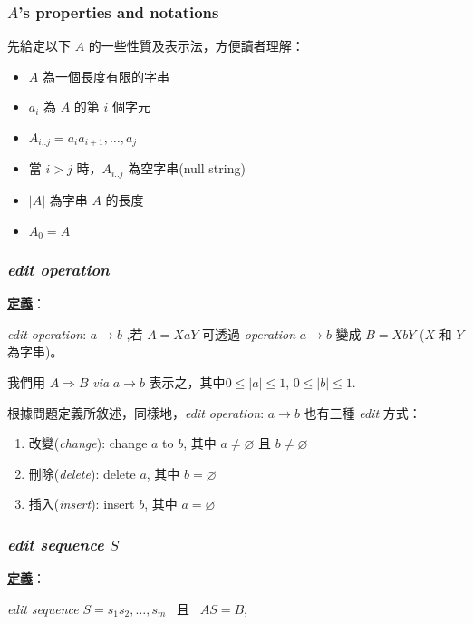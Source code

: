 \documentclass[15pt]{extarticle}
\begin{document}
\subsubsection{{$A$}'s properties and notations}

先給定以下 $A$ 的一些性質及表示法，方便讀者理解：
\begin{itemize}
    \item $A$ 為一個\uline{長度有限}的字串
    \item $a_i$ 為 $A$ 的第 $i$ 個字元
    \item $A_{i..j} = a_ia_{i + 1}, \dots, a_{j}$
    \item 當 $i > j$ 時，$A_{i..j}$ 為空字串(null string)
    \item $|A|$ 為字串 $A$ 的長度
    \item $A_0 = A$
\end{itemize}

\subsubsection{\textit{edit operation}}

\textbf{\uline{定義}}： 

\begin{center}
\textit{edit operation}: $a\to b$ ,若 $A=XaY$ 可透過 \textit{operation} $a \to b$ 變成 $B = XbY$ ($X$ 和 $Y$ 為字串)。
\end{center}

我們用 $A \Rightarrow B$ \textit{via} $a \to b$ 表示之，其中$0 \le |a| \le 1$, $0 \le |b| \le 1$.

根據問題定義所敘述，同樣地，\textit{edit operation}: $a \to b$ 也有三種 \textit{edit} 方式：
\begin{enumerate}
    \item 改變(\textit{change}): change $a$ to $b$, 其中 $a \ne \varnothing$ 且 $b \ne \varnothing$
    \item 刪除(\textit{delete}): delete $a$, 其中 $b = \varnothing$ 
    \item 插入(\textit{insert}): insert $b$, 其中 $a = \varnothing$
\end{enumerate}

\subsubsection{\textit{edit sequence} $S$}

\textbf{\uline{定義}}：

\begin{center}
    \textit{edit sequence} $S = s_1s_2, \dots, s_m$ \mbox{ 且 } $AS = B$,
\end{center}
\end{document}
